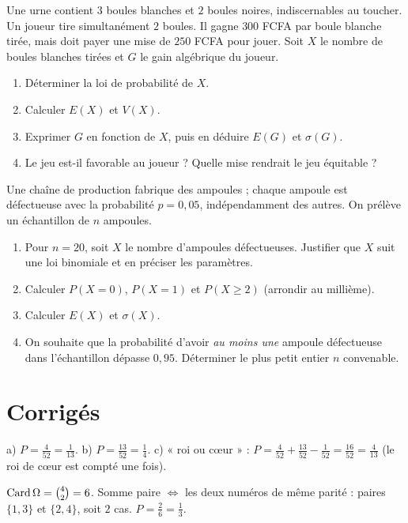 Une urne contient $3$ boules blanches et $2$ boules noires, indiscernables au
toucher. Un joueur tire simultanément $2$ boules. Il gagne $300$ FCFA par boule
blanche tirée, mais doit payer une mise de $250$ FCFA pour jouer. Soit $X$ le
nombre de boules blanches tirées et $G$ le gain algébrique du joueur.
\begin{enumerate}[label=\arabic*)]
\item Déterminer la loi de probabilité de $X$.
\item Calculer $E(X)$ et $V(X)$.
\item Exprimer $G$ en fonction de $X$, puis en déduire $E(G)$ et $\sigma(G)$.
\item Le jeu est-il favorable au joueur ? Quelle mise rendrait le jeu équitable ?
\end{enumerate}

Une chaîne de production fabrique des ampoules ; chaque ampoule est défectueuse
avec la probabilité $p=0{,}05$, indépendamment des autres. On prélève un
échantillon de $n$ ampoules.
\begin{enumerate}[label=\arabic*)]
\item Pour $n=20$, soit $X$ le nombre d'ampoules défectueuses. Justifier que $X$
suit une loi binomiale et en préciser les paramètres.
\item Calculer $P(X{=}0)$, $P(X{=}1)$ et $P(X\ge2)$ (arrondir au millième).
\item Calculer $E(X)$ et $\sigma(X)$.
\item On souhaite que la probabilité d'avoir \emph{au moins une} ampoule
défectueuse dans l'échantillon dépasse $0{,}95$. Déterminer le plus petit entier
$n$ convenable.
\end{enumerate}

\section{Corrigés}

a) $P=\frac{4}{52}=\frac1{13}$.\;
b) $P=\frac{13}{52}=\frac14$.\;
c) « roi ou c\oe ur » : $P=\frac{4}{52}+\frac{13}{52}-\frac{1}{52}=\frac{16}{52}=\frac{4}{13}$
(le roi de c\oe ur est compté une fois).

$\operatorname{Card}\Omega=\binom42=6$. Somme paire $\Leftrightarrow$ les deux numéros de même
parité : paires $\{1,3\}$ et $\{2,4\}$, soit $2$ cas. $P=\frac26=\frac13$.

